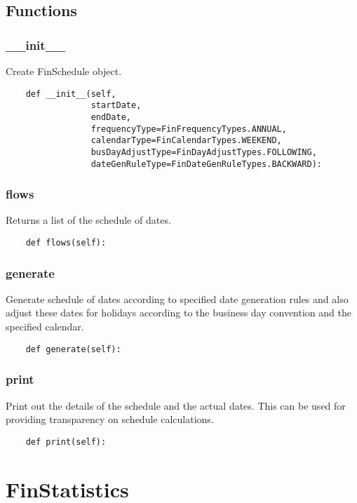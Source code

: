 \documentclass[twoside,11pt]{book}
\begin{document}
\subsection*{Functions}

\subsubsection*{{\bf \_\_init\_\_}}
Create FinSchedule object.  

\begin{lstlisting}
    def __init__(self,
                 startDate,
                 endDate,
                 frequencyType=FinFrequencyTypes.ANNUAL,
                 calendarType=FinCalendarTypes.WEEKEND,
                 busDayAdjustType=FinDayAdjustTypes.FOLLOWING,
                 dateGenRuleType=FinDateGenRuleTypes.BACKWARD):
\end{lstlisting}

\subsubsection*{{\bf flows}}
Returns a list of the schedule of dates.  

\begin{lstlisting}
    def flows(self):
\end{lstlisting}

\subsubsection*{{\bf generate}}
Generate schedule of dates according to specified date generation rules and also adjust these dates for holidays according to the business day convention and the specified calendar.  

\begin{lstlisting}
    def generate(self):
\end{lstlisting}

\subsubsection*{{\bf print}}
Print out the details of the schedule and the actual dates. This can be used for providing transparency on schedule calculations.  

\begin{lstlisting}
    def print(self):
\end{lstlisting}

\newpage
\section{FinStatistics}
\end{document}
